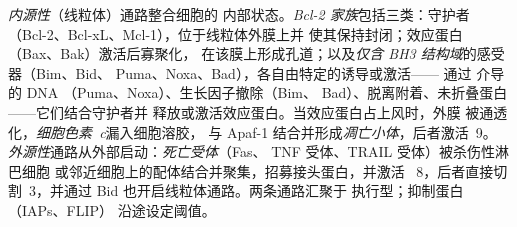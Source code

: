 \begin{definition}[两条通路]\label{def:b3:cell-cycle-apoptosis:pathways}
\emph{内源性}（线粒体）通路整合细胞的
内部状态。\emph{Bcl-2 家族}包括三类：守护者
（Bcl-2、Bcl-xL、Mcl-1），位于线粒体外膜上并
使其保持封闭；效应蛋白（Bax、Bak）激活后寡聚化，
在该膜上形成孔道；以及\emph{仅含 BH3 结构域}的感受器（Bim、Bid、
Puma、Noxa、Bad），各自由特定的诱导或激活——
通过  介导的 DNA （Puma、Noxa）、生长因子撤除（Bim、
Bad）、脱离附着、未折叠蛋白——它们结合守护者并
释放或激活效应蛋白。当效应蛋白占上风时，外膜
被通透化，\emph{细胞色素~c}漏入细胞溶胶，
与 Apaf-1 结合并形成\emph{凋亡小体}，后者激活~9。
\emph{外源性}通路从外部启动：\emph{死亡受体}（Fas、
TNF 受体、TRAIL 受体）被杀伤性淋巴细胞
或邻近细胞上的配体结合并聚集，招募接头蛋白，并激活
~8，后者直接切割~3，并通过 Bid
也开启线粒体通路。两条通路汇聚于
执行型；抑制蛋白（IAPs、FLIP）
沿途设定阈值。
\end{definition}

